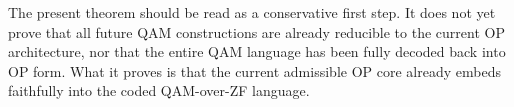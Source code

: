 \begin{remark}
The present theorem should be read as a conservative first step. It does not yet prove that all future QAM constructions are already reducible to the current OP architecture, nor that the entire QAM language has been fully decoded back into OP form. What it proves is that the current admissible OP core already embeds faithfully into the coded QAM-over-ZF language.
\end{remark}

